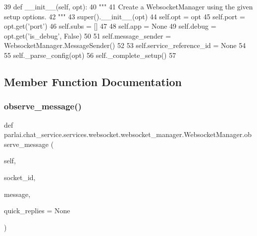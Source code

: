 \begin{DoxyCode}
39     \textcolor{keyword}{def }\_\_init\_\_(self, opt):
40         \textcolor{stringliteral}{"""}
41 \textcolor{stringliteral}{        Create a WebsocketManager using the given setup options.}
42 \textcolor{stringliteral}{        """}
43         super().\_\_init\_\_(opt)
44         self.opt = opt
45         self.port = opt.get(\textcolor{stringliteral}{'port'})
46         self.subs = []
47 
48         self.app = \textcolor{keywordtype}{None}
49         self.debug = opt.get(\textcolor{stringliteral}{'is\_debug'}, \textcolor{keyword}{False})
50 
51         self.message\_sender = WebsocketManager.MessageSender()
52 
53         self.service\_reference\_id = \textcolor{keywordtype}{None}
54 
55         self.\_parse\_config(opt)
56         self.\_complete\_setup()
57 
\end{DoxyCode}


\subsection{Member Function Documentation}
\mbox{\label{classparlai_1_1chat__service_1_1services_1_1websocket_1_1websocket__manager_1_1WebsocketManager_ab4710951b0d3ac7e00836c15760edf4a}} 
\subsubsection{\texorpdfstring{observe\+\_\+message()}{observe\_message()}}
{\footnotesize\ttfamily def parlai.\+chat\+\_\+service.\+services.\+websocket.\+websocket\+\_\+manager.\+Websocket\+Manager.\+observe\+\_\+message (\begin{DoxyParamCaption}\item[{}]{self,  }\item[{}]{socket\+\_\+id,  }\item[{}]{message,  }\item[{}]{quick\+\_\+replies = {\ttfamily None} }\end{DoxyParamCaption})}

